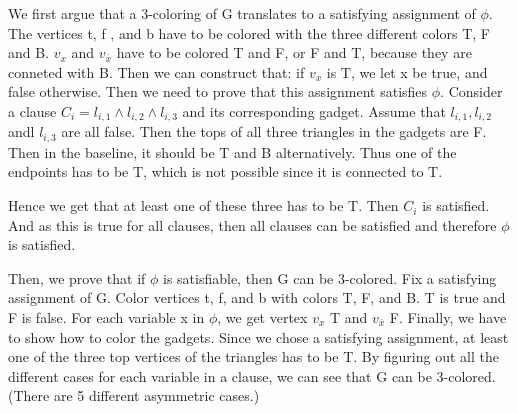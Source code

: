 \documentclass[usletter]{article}
\begin{document}
We first argue that a 3-coloring of G translates to a satisfying assignment
of $\phi$. The vertices t, f , and b have to be colored with the three different
colors T, F and B. $v_{x}$ and $v_{\overline{x}}$ have to be colored T and F, or F and T, because they are conneted with B. Then we can construct that: if $v_{x}$ is T, we let x be true, and false otherwise. Then we need to prove that this assignment satisfies $\phi$. Consider a clause $C_{i}= l_{i,1} \wedge l_{i,2} \wedge l_{i,3}$ and its corresponding gadget. Assume that $l_{i,1}, l_{i,2}$ andl $l_{i,3}$ are all false. Then the tops of all three triangles in the gadgets are F. Then in the baseline, it should be T and B alternatively. Thus one of the endpoints has to be T, which is not possible since it is connected to T.

Hence we get that at least one of these three has to be T. Then $C_{i}$ is satisfied. And as this is true for all clauses, then all clauses can be satisfied and therefore $\phi$ is satisfied. 

Then, we prove that if $\phi$ is satisfiable, then G can be 3-colored. Fix a satisfying assignment of G. Color vertices t, f, and b with colors T, F, and B. T is true and F is false. For each variable x in $\phi$, we get vertex $v_{x}$ T and $v_{\overline{x}}$ F. Finally, we have to show how to color the gadgets. Since we chose a satisfying assignment, at least one of the three top vertices of the triangles has to be T. By figuring out all the different cases for each variable in a clause, we can see that G can be 3-colored. (There are 5 different asymmetric cases.)



\end{document}
